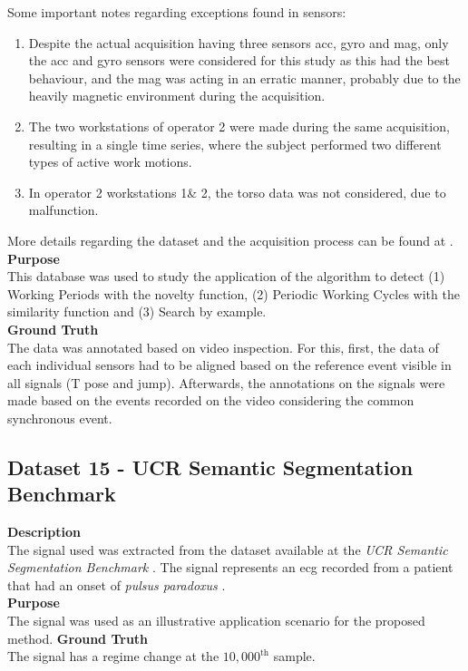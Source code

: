 Some important notes regarding exceptions found in sensors:
\begin{enumerate}
\item Despite the actual acquisition having three sensors \gls{acc}, \gls{gyro} and \gls{mag}, only the \gls{acc} and \gls{gyro} sensors were considered for this study as this had the best behaviour, and the \gls{mag} was acting in an erratic manner, probably due to the heavily magnetic environment during the acquisition.
\item The two workstations of operator 2 were made during the same acquisition, resulting in a single time series, where the subject performed two different types of active work motions.
\item In operator 2 workstations 1\& 2, the torso data was not considered, due to malfunction.
\end{enumerate}

More details regarding the dataset and the acquisition process can be found at \cite{santos2019, sara}.\\
\textbf{Purpose}\hfill \\
This database was used to study the application of the algorithm to detect (1) Working Periods with the novelty function, (2) Periodic Working Cycles with the similarity function and (3) Search by example. \\
\textbf{Ground Truth}\hfill \\
The data was annotated based on video inspection. For this, first, the data of each individual sensors had to be aligned based on the reference event visible in all signals (T pose and jump). Afterwards, the annotations on the signals were made based on the events recorded on the video considering the common synchronous event.

\subsection{Dataset 15 - UCR Semantic Segmentation Benchmark}
\label{dat:dataset15}

\textbf{Description}\\
The signal used was extracted from the dataset available at the \textit{UCR Semantic Segmentation Benchmark} \cite{eamonn_segmentation}. The signal represents an \gls{ecg} recorded from a patient that had an onset of \textit{pulsus paradoxus} \cite{pulsusparadoxus, pulsusparadoxus2}.\\
\textbf{Purpose}\\
The signal was used as an illustrative application scenario for the proposed method.
\textbf{Ground Truth}\\
The signal has a regime change at the $10,000^\text{th}$ sample.\\

